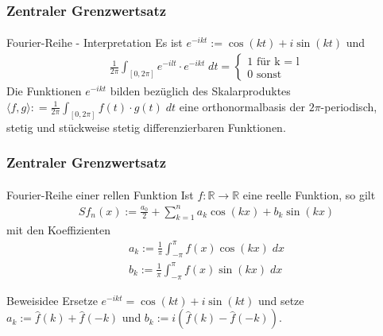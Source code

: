 \documentclass{beamer}
\begin{document}
\begin{frame}
    \frametitle{Zentraler Grenzwertsatz}
\framesubtitle{}

\begin{block}{Fourier-Reihe - Interpretation}
Es ist $e^{-ikt} := \cos (k t) + i \sin(kt)$ und 
\begin{align*}
  \frac{1}{2 \pi}  \int_{[0, 2 \pi]}  e^{-ilt} \cdot e^{-ikt} \; dt = \begin{cases} 1 \text{ für k = l}  \\ 0 \text{ sonst }\end{cases}
\end{align*}
Die Funktionen  $e^{-ikt}$ bilden bezüglich des Skalarproduktes $\langle f, g \rangle : =\frac{1}{2 \pi}  \int_{[0, 2 \pi]}  f(t) \cdot g(t) \; dt$ eine orthonormalbasis der $2\pi$-periodisch, stetig und stückweise stetig differenzierbaren Funktionen.
\end{block}
 \end{frame}


\begin{frame}
    \frametitle{Zentraler Grenzwertsatz}
\framesubtitle{}

\begin{block}{Fourier-Reihe einer rellen Funktion}
Ist $f :\mathbb{R} \to \mathbb{R}$ eine reelle Funktion, so gilt
\begin{align*}
Sf_n(x) := \frac{a_0}{2} + \sum_{k= 1}^{n} a_k \cos (kx) + b_k \sin (kx)  
\end{align*}
mit den Koeffizienten
\begin{align*}
a_k := \frac{1}{ \pi} \int_{-\pi}^{\pi} f(x) \cos (kx)\; dx \\
b_k := \frac{1}{ \pi} \int_{-\pi}^{\pi} f(x) \sin (kx)\; dx
\end{align*}

\end{block}
\begin{block}{Beweisidee}
Ersetze   $e^{-ikt} = \cos(kt) + i \sin (kt)$ und setze $a_k := \hat{f}(k) + \hat{f}(-k)$ und $b_k :=  i(\hat{f}(k) - \hat{f}(-k))$.
\end{block}
 \end{frame}
\end{document}
